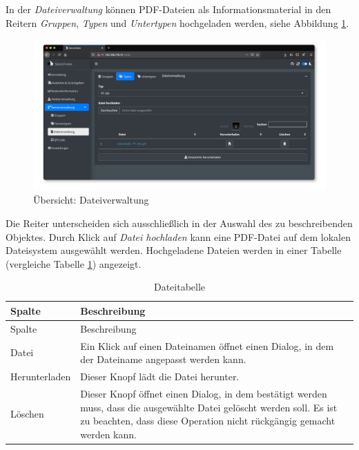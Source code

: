 \documentclass[
]{article}
\begin{document}
In der \emph{Dateiverwaltung} können PDF-Dateien als Informationsmaterial in den Reitern \emph{Gruppen}, \emph{Typen} und \emph{Untertypen} hochgeladen werden, siehe Abbildung \ref{fig:file-management-overview}.

\begin{figure}
\centering
\includegraphics{./img/file_management_overview.png}
\caption{\label{fig:file-management-overview}Übersicht: Dateiverwaltung}
\end{figure}

Die Reiter unterscheiden sich ausschließlich in der Auswahl des zu beschreibenden Objektes. Durch Klick auf \emph{Datei hochladen} kann eine PDF-Datei auf dem lokalen Dateisystem ausgewählt werden. Hochgeladene Dateien werden in einer Tabelle (vergleiche Tabelle \ref{tab:file-table}) angezeigt.

\begin{longtable}[]{@{}
  >{\raggedright\arraybackslash}p{}
  >{\raggedright\arraybackslash}p{}@{}}
\caption{\label{tab:file-table} Dateitabelle}\tabularnewline
\toprule
Spalte & Beschreibung \\
\midrule
\endfirsthead
\toprule
Spalte & Beschreibung \\
\midrule
\endhead
Datei & Ein Klick auf einen Dateinamen öffnet einen Dialog, in dem der Dateiname angepasst werden kann. \\
Herunterladen & Dieser Knopf lädt die Datei herunter. \\
Löschen & Dieser Knopf öffnet einen Dialog, in dem bestätigt werden muss, dass die ausgewählte Datei gelöscht werden soll. Es ist zu beachten, dass diese Operation nicht rückgängig gemacht werden kann. \\
\bottomrule
\end{longtable}
\end{document}

